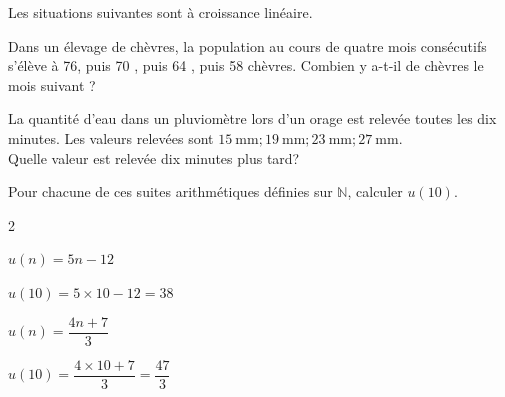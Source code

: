 \documentclass[11pt,a4paper]{article}  %
\begin{document}
	\graphicspath{{images/}}
	
	\begin{center}
		
		
	\end{center}



Les situations suivantes sont à croissance linéaire.
\begin{enumMet}
	\item Dans un élevage de chèvres, la population au cours de quatre mois consécutifs s'élève à 76, puis 70 , puis 64 , puis 58 chèvres.
	Combien y a-t-il de chèvres le mois suivant ? 
	\item La quantité d'eau dans un pluviomètre lors d'un orage est relevée toutes les dix minutes. Les valeurs relevées sont $15 \mathrm{~mm} ; 19 \mathrm{~mm} ; 23 \mathrm{~mm} ; 27 \mathrm{~mm}$.\\
	Quelle valeur est relevée dix minutes plus tard? 
\end{enumMet}

Pour chacune de ces suites arithmétiques définies sur $\mathbb{N}$, calculer $u(10)$.
\begin{multicols}{2}
	\begin{enumMet}
	\item $u(n)=5 n-12$
	\begin{corrBox}
		$u(10)=5\times 10-12=38$	
	\end{corrBox}
	\columnbreak
	\item $u(n)=\dfrac{4 n+7}{3}$
	\begin{corrBox}
		$u(10)=\dfrac{4\times10+7}{3}=\dfrac{47}{3}$	
	\end{corrBox}
\end{enumMet}
\end{multicols}
\end{document}

